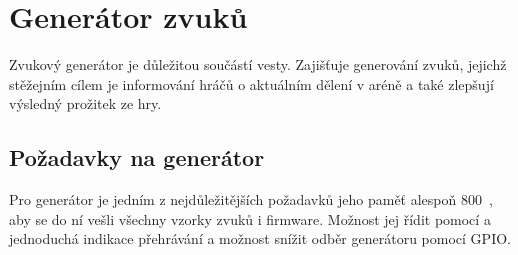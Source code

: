 \chapter{Generátor zvuků}
Zvukový generátor je důležitou součástí  vesty. Zajišťuje generování zvuků, jejichž stěžejním cílem je informování hráčů o aktuálním dělení v aréně a také zlepšují výsledný prožitek ze hry.

\section{Požadavky na generátor}
Pro generátor je jedním z nejdůležitějších požadavků jeho paměť alespoň 800~, aby se do ní vešli všechny vzorky zvuků i firmware.  Možnost jej řídit pomocí  a jednoduchá indikace přehrávání a možnost snížit odběr generátoru pomocí GPIO.



